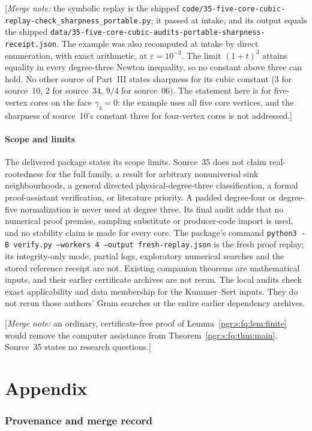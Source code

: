 \documentclass[11pt]{article}
\numberwithin{equation}{section}
\theoremstyle{definition}\newtheorem{definition}[theorem]{Definition}\newtheorem{remark}[theorem]{Remark}
\newcommand{\mnote}[1]{[\textit{Merge note:} #1]}
\begin{document}
\mnote{the symbolic replay is the shipped
\nolinkurl{code/35-five-core-cubic-replay-check_sharpness_portable.py};
it passed at intake, and its output equals the shipped
\nolinkurl{data/35-five-core-cubic-audits-portable-sharpness-receipt.json}.
The example was also recomputed at intake by direct enumeration, with
exact arithmetic, at $\varepsilon=10^{-3}$. The limit $(1+t)^3$ attains
equality in every degree-three Newton inequality, so no constant above
three can hold. No other source of Part~III states sharpness for its
cubic constant ($3$ for source~10, $2$ for source~34, $9/4$ for
source~06). The statement here is for five-vertex cores on the face
$\gamma_4=0$: the example uses all five core vertices, and the sharpness of
source~10's constant three for four-vertex cores is not addressed.}

\subsection{Scope and limits}
The delivered package states its scope limits. Source~35 does not claim
real-rootedness for the full family, a result for arbitrary nonuniversal
sink neighbourhoods, a general directed physical-degree-three
classification, a formal proof-assistant verification, or literature
priority. A padded degree-four or degree-five normalization is never used
at degree three. Its final audit adds that no numerical proof premise,
sampling substitute or producer-code import is used, and no stability
claim is made for every core. The package's command
\texttt{python3 -B verify.py \mbox{--workers 4} \mbox{--output fresh-replay.json}} is
the fresh proof replay; its integrity-only mode, partial logs, exploratory
numerical searches and the stored reference receipt are not. Existing
companion theorems are mathematical inputs, and their earlier certificate
archives are not rerun. The local audits check exact applicability and
data membership for the Kummer--Sert inputs. They do not rerun those
authors' Gram searches or the entire earlier dependency archives.

\mnote{an ordinary, certificate-free proof of
Lemma~\ref{pgr:s:fq:lem:finite} would remove the computer assistance from
Theorem~\ref{pgr:s:fq:thm:main}. Source~35 states no research questions.}


\part*{Appendix}
\appendix
\section{Provenance and merge record}\label{pgr:sec:provenance}
\end{document}
